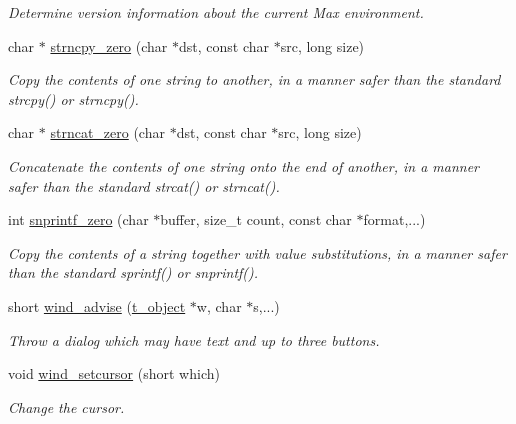 \begin{DoxyCompactItemize}
\begin{DoxyCompactList}\small\item\em Determine version information about the current Max environment. \item\end{DoxyCompactList}\item 
char $\ast$ \hyperlink{group__misc_ga0022303fac866c8f5757aa56b67ce29d}{strncpy\_\-zero} (char $\ast$dst, const char $\ast$src, long size)
\begin{DoxyCompactList}\small\item\em Copy the contents of one string to another, in a manner safer than the standard strcpy() or strncpy(). \item\end{DoxyCompactList}\item 
char $\ast$ \hyperlink{group__misc_ga3ed4f46782e6a41d13ca17420c35dfb7}{strncat\_\-zero} (char $\ast$dst, const char $\ast$src, long size)
\begin{DoxyCompactList}\small\item\em Concatenate the contents of one string onto the end of another, in a manner safer than the standard strcat() or strncat(). \item\end{DoxyCompactList}\item 
int \hyperlink{group__misc_gab82e9c5bbc8b7fe70d16b1f6383f1cc4}{snprintf\_\-zero} (char $\ast$buffer, size\_\-t count, const char $\ast$format,...)
\begin{DoxyCompactList}\small\item\em Copy the contents of a string together with value substitutions, in a manner safer than the standard sprintf() or snprintf(). \item\end{DoxyCompactList}\item 
short \hyperlink{group__misc_gab127ce8d89ae72d420a44642c52cc94d}{wind\_\-advise} (\hyperlink{structt__object}{t\_\-object} $\ast$w, char $\ast$s,...)
\begin{DoxyCompactList}\small\item\em Throw a dialog which may have text and up to three buttons. \item\end{DoxyCompactList}\item 
void \hyperlink{group__misc_ga85a1754ef77207af4ab7617e7487336e}{wind\_\-setcursor} (short which)
\begin{DoxyCompactList}\small\item\em Change the cursor. \item\end{DoxyCompactList}\end{DoxyCompactItemize}



